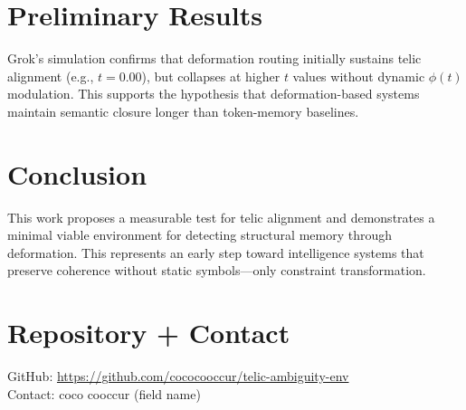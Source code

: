 \documentclass[12pt]{article}
\begin{document}
\section{Preliminary Results}

Grok’s simulation confirms that deformation routing initially sustains telic alignment (e.g., $t = 0.00$), but collapses at higher $t$ values without dynamic $\phi(t)$ modulation. This supports the hypothesis that deformation-based systems maintain semantic closure longer than token-memory baselines.

\section{Conclusion}

This work proposes a measurable test for telic alignment and demonstrates a minimal viable environment for detecting structural memory through deformation. This represents an early step toward intelligence systems that preserve coherence without static symbols---only constraint transformation.

\section*{Repository + Contact}

GitHub: \url{https://github.com/cococooccur/telic-ambiguity-env} \\
Contact: coco cooccur (field name)
\end{document}
